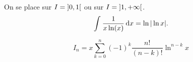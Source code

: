 \documentclass{magnolia}
\begin{document}
\begin{sol}
\begin{questions}
\question On se place sur $I=\left]0,1\right[$ ou sur $I=\left]1,+\infty\right[$.
$$\int_{}^{} \frac{1}{x\ln(x)}\,\text{d}x=\ln|\ln x|.$$

\question
\[I_n=x\sum_{k=0}^n (-1)^k \frac{n!}{(n-k)!}\ln^{n-k} x\]   
\end{questions}
\end{sol}

\end{document}
